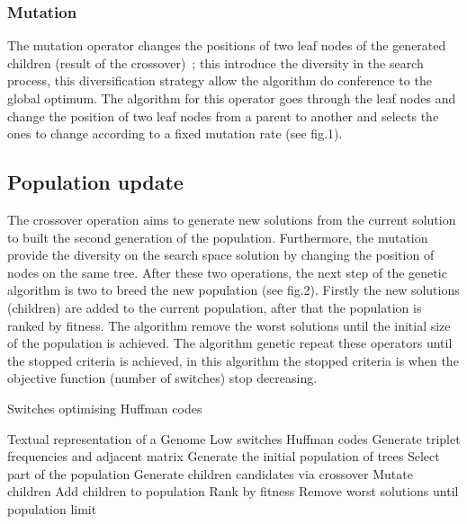 \documentclass[preprint,12pt]{elsarticle}
\begin{document}
\subsubsection{Mutation}
The mutation operator changes the positions of two leaf nodes of the generated children (result of the crossover)~\cite{muhlenbein1992genetic}; this introduce the diversity in the search process, this diversification strategy allow the algorithm do conference to the global optimum. The algorithm for this operator goes through the leaf nodes and change the position of two leaf nodes from a parent to another and selects the ones to change according to a fixed mutation rate (see fig.1).
\subsection{Population update}
The crossover operation aims to generate new solutions from the current solution to built the second generation of the population. Furthermore, the mutation provide the diversity on the search space solution by changing the position of  nodes on the same tree. After these two operations, the next step of the genetic algorithm is two to breed the new population (see fig.2). Firstly the new solutions (children) are added to the current population, after that the population is ranked by fitness. The algorithm remove the worst solutions until the initial size of the population is achieved. The algorithm genetic repeat these operators until the stopped criteria is achieved, in this algorithm the stopped criteria is when the objective function (number of switches) stop decreasing.
\begin{algorithm}[!btph]
\caption{Switches optimising Huffman codes}
\label{alg1}
\begin{algorithmic}[1]
\REQUIRE Textual representation of a Genome
\ENSURE Low switches Huffman codes
\STATE Generate triplet frequencies and adjacent matrix 
\STATE Generate the initial  population of trees
\REPEAT 
\STATE Select part of the population
\STATE Generate children candidates via crossover
\STATE Mutate children
\STATE Add children to population
\STATE Rank by fitness
\STATE Remove worst solutions until population limit
\end{algorithmic}
\end{algorithm}
\end{document}
